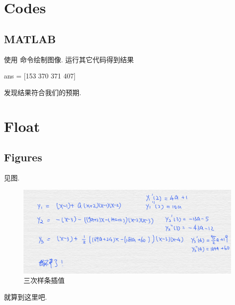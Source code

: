 \documentclass[a4paper, 12pt]{ctexart}
\title{\TITLE}
\author{\AUTHOR}
\date{\today}
\let\oldlstinputlisting
\renewcommand{}[2][\empty]{
    \par\nolinenumbers\oldlstinputlisting[#1]{#2}\linenumbers\par
}
\let\oldlstlisting\lstlisting
\let\oldendlstlisting\endlstlisting
\renewenvironment{lstlisting}
    {\par\nolinenumbers\oldlstlisting}
    {\oldendlstlisting\endnolinenumbers\par}
\renewcommand{\lstinline}[2][]{\colorbox{lightgray}{\oldlstinline[#1]{#2}}}
\newcommand{\matlabinline}[1]{
    \lstinline[style=MATLAB-editor, basicstyle=\mlttfamily]{#1}}
\theoremstyle{plain}
\theoremstyle{plain}
\theoremstyle{plain}
\theoremstyle{nonumberplain}
\begin{document}

    \maketitle
    \thispagestyle{empty}



    \newpage
    \tableofcontents


    \newpage
    \pagestyle{fancy}
    \linenumbers

    \section{Codes}

    \subsection{MATLAB}

    
    使用\matlabinline{plot}命令绘制图像.
    运行其它代码得到结果
    \begin{lstlisting}[
        title=标题,
        style=MATLAB-editor,
        basicstyle=\mlttfamily\scriptsize,
        numberstyle={\color{black!33}\scriptsize\sffamily}
    ]
        ans = [153 370 371 407]
    \end{lstlisting}
    发现结果符合我们的预期.

    \section{Float}

    \subsection{Figures}

    见图.
    \begin{figure}[H]
        \centering
        \includegraphics[scale=0.2]{figure.jpg}
        \caption{三次样条插值}
        \label{figure_spline}
    \end{figure}
    就算到这里吧.
\end{document}
